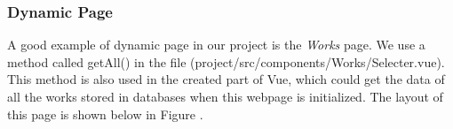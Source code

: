 \documentclass{article}
\begin{document}
\subsubsection{Dynamic Page}
A good example of dynamic page in our project is the \textit{Works} page.
We use a method called getAll() in the file
(project/src/components/Works/Selecter.vue). This method is also used in the 
created part of Vue, which could get the data of all the works stored in databases
when this webpage is initialized. The layout of this page is shown below in 
Figure .

\begin{figure}[]
    \centering
    
    \caption{}
    \label{}
\end{figure}
    
\end{document}
